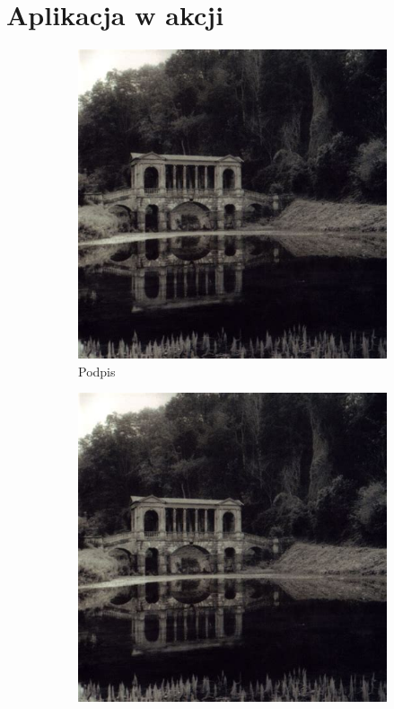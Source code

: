 \documentclass[12pt]{article}
\begin{document}
\section {Aplikacja w akcji}
\clearpage

\begin{figure}[h!]
	\centering
	\begin{subfigure}[b]{0.25\linewidth}
		\includegraphics[width=\linewidth]{zdj/morn.jpeg}
		\caption{Podpis}
	\end{subfigure}
	\begin{subfigure}[b]{0.32\linewidth}
		\includegraphics[width=\linewidth]{zdj/morn.jpeg}

\end{subfigure}
\end{figure}
\end{document}
